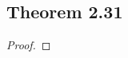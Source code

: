 \documentclass[../../main.tex]{subfiles}
\begin{document}
\subsection{Theorem 2.31}
\begin{wts}

\end{wts}
\begin{proof}

\end{proof}
\end{document}

